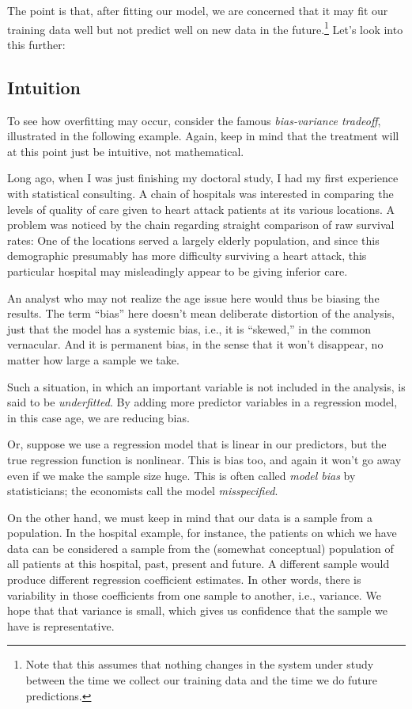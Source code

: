 The point is that, after fitting our model, we are concerned that it may
fit our training data well but not predict well on new data in the
future.\footnote{Note that this assumes that nothing changes in the
system under study between the time we collect our training data and the
time we do future predictions.}  Let's look into this further:

\subsection{Intuition}
\label{longago}

To see how overfitting may occur, consider the famous {\it bias-variance
tradeoff}, illustrated in the following example.  Again, keep in mind
that the treatment will at this point just be intuitive, not
mathematical.

Long ago, when I was just finishing my doctoral study, I had my first
experience with statistical consulting.  A chain of hospitals was
interested in comparing the levels of quality of care given to heart
attack patients at its various locations.  A problem was noticed by the
chain regarding straight comparison of raw survival rates:  One of the
locations served a largely elderly population, and since this
demographic presumably has more difficulty surviving a heart attack,
this particular hospital may misleadingly appear to be giving inferior
care.  

An analyst who may not realize the age issue here would thus be biasing
the results.  The term ``bias'' here doesn't mean deliberate distortion
of the analysis, just that the model has a systemic bias, i.e., it is
``skewed,'' in the common vernacular.  And it is permanent bias, in the
sense that it won't disappear, no matter how large a sample we take.  

Such a situation, in which an important variable is not included in the
analysis, is said to be {\it underfitted}.  By adding more predictor
variables in a regression model, in this case age, we are reducing bias.

Or, suppose we use a regression model that is linear in our predictors,
but the true regression function is nonlinear.  This is bias too, and
again it won't go away even if we make the sample size huge.  This is
often called {\it model bias} by statisticians; the economists call the
model {\it misspecified}.

On the other hand, we must keep in mind that our data is a
sample from a population.  In the hospital example, for instance, the
patients on which we have data can be considered a sample from the
(somewhat conceptual) population of all patients at this hospital, past,
present and future.  A different sample would produce different
regression coefficient estimates.  In other words, there is variability
in those coefficients from one sample to another, i.e., variance.  We
hope that that variance is small, which gives us confidence that the
sample we have is representative.

